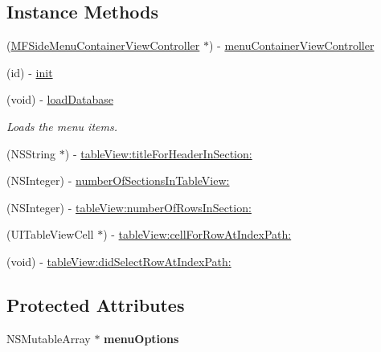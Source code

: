 \subsection*{Instance Methods}
\begin{DoxyCompactItemize}
\item 
(\hyperlink{interface_m_f_side_menu_container_view_controller}{M\-F\-Side\-Menu\-Container\-View\-Controller} $\ast$) -\/ \hyperlink{interface_side_menu_view_controller_ad9f497773e1c2f5e420929a60f3bf7df}{menu\-Container\-View\-Controller}
\item 
(id) -\/ \hyperlink{interface_side_menu_view_controller_a4213bb26f5207ee3f402fe463badc691}{init}
\item 
\hypertarget{interface_side_menu_view_controller_a2c868393a6f59adcf2a8973ca95d631b}{(void) -\/ \hyperlink{interface_side_menu_view_controller_a2c868393a6f59adcf2a8973ca95d631b}{load\-Database}}\label{interface_side_menu_view_controller_a2c868393a6f59adcf2a8973ca95d631b}

\begin{DoxyCompactList}\small\item\em Loads the menu items. \end{DoxyCompactList}\item 
(N\-S\-String $\ast$) -\/ \hyperlink{interface_side_menu_view_controller_a5757190cb856a85c44de064864982f27}{table\-View\-:title\-For\-Header\-In\-Section\-:}
\item 
(N\-S\-Integer) -\/ \hyperlink{interface_side_menu_view_controller_a06b0471f3085f21304b18e41c6bfac6f}{number\-Of\-Sections\-In\-Table\-View\-:}
\item 
(N\-S\-Integer) -\/ \hyperlink{interface_side_menu_view_controller_aab440a4915232be470a3170a94dc5c82}{table\-View\-:number\-Of\-Rows\-In\-Section\-:}
\item 
(U\-I\-Table\-View\-Cell $\ast$) -\/ \hyperlink{interface_side_menu_view_controller_a8b22b55c4ff90cc2a2a96f2a38695ffe}{table\-View\-:cell\-For\-Row\-At\-Index\-Path\-:}
\item 
(void) -\/ \hyperlink{interface_side_menu_view_controller_a6741a2fd8b94b02a8b6adb99b30ba7d1}{table\-View\-:did\-Select\-Row\-At\-Index\-Path\-:}
\end{DoxyCompactItemize}
\subsection*{Protected Attributes}
\begin{DoxyCompactItemize}
\item 
\hypertarget{interface_side_menu_view_controller_a90224d9e597665265fbf07aac6847cc5}{N\-S\-Mutable\-Array $\ast$ {\bfseries menu\-Options}}\label{interface_side_menu_view_controller_a90224d9e597665265fbf07aac6847cc5}

\end{DoxyCompactItemize}


